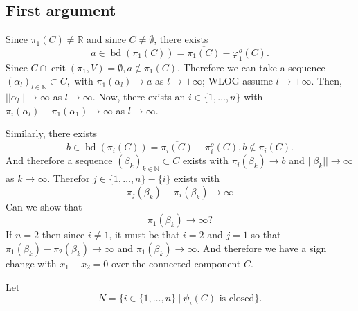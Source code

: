 \documentclass[11pt]{article}
\theoremstyle{definition}
\newcommand{\N}{\mathbb{N}}
\newcommand{\R}{\mathbb{R}}
\newcommand{\vp}{\varphi}
\DeclareMathOperator{\bd}{bd}
\DeclareMathOperator{\crit}{crit}
\begin{document}
\subsection*{First argument}
Since $\pi_1(C) \not = \R$ and since $C \not = \emptyset$, there exists 
\[
a \in \bd(\pi_1(C)) = \overline{\pi_1(C)} - \vp_{1}^o(C).
\]
Since $C \cap \crit(\pi_1,V) = \emptyset, a \not \in \pi_1(C).$ Therefore we can take a sequence $(\alpha_l)_{l \in \N} \subset C,$ with $\pi_1(\alpha_l) \rightarrow a$ as $l \rightarrow \pm\infty$; WLOG assume $l \rightarrow +\infty.$ Then, $||\alpha_l|| \rightarrow \infty$ as $l \rightarrow \infty.$ Now, there exists an $i \in \{1,\hdots,n\}$ with $\pi_i(\alpha_l) - \pi_1(\alpha_1) \rightarrow \infty$ as $l \rightarrow \infty.$ 
\par 
Similarly, there exists 
\[
b \in \bd(\pi_i(C)) = \overline{\pi_i(C)} - \pi_i^o(C), b \not \in \pi_i(C).
\]
And therefore a sequence $(\beta_k)_{k \in \N} \subset C$ exists with $\pi_i(\beta_k) \rightarrow b$ and $|| \beta_k|| \rightarrow \infty$ as $k \rightarrow \infty.$ Therefor  $j \in \{1,\hdots,n\}-\{i\}$ exists with 
\[
\pi_j(\beta_k) - \pi_i(\beta_k) \rightarrow \infty
\]
\color{red}
Can we show that 
\[
\pi_1(\beta_k) \rightarrow \infty?
\]
\color{black}
If $n=2$ then since $i \not = 1$, it must be that $i=2$ and $j=1$ so that  $\pi_1(\beta_k) - \pi_2(\beta_k) \rightarrow \infty$ and $\pi_1(\beta_k) \rightarrow \infty.$ And therefore we have a sign change with $x_1-x_2=0$ over the connected component $C$. 
\par 
Let 
\[
N = \big\{i \in \{1,\hdots,n\} ~|~ \psi_i(C) \textrm{ is closed}\big\}. 
\]
\end{document}
